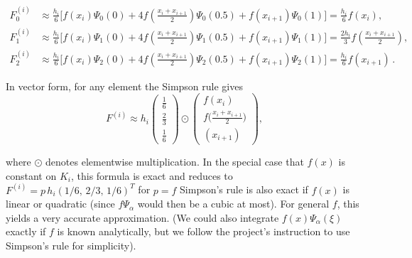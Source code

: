 \begin{align*}
	F^{(i)}_0 & \approx \frac{h_i}{6}\big[f(x_i)\Psi_0(0) + 4f(\tfrac{x_i+x_{i+1}}{2})\Psi_0(0.5)+f(x_{i+1})\Psi_0(1)\big] = \frac{h_i}{6} f(x_i),                                 \\
	F^{(i)}_1 & \approx \frac{h_i}{6}\big[f(x_i)\Psi_1(0) + 4f(\tfrac{x_i+x_{i+1}}{2})\Psi_1(0.5)+f(x_{i+1})\Psi_1(1)\big] = \frac{2h_i}{3} f\!\left(\frac{x_i+x_{i+1}}{2}\right), \\
	F^{(i)}_2 & \approx \frac{h_i}{6}\big[f(x_i)\Psi_2(0) + 4f(\tfrac{x_i+x_{i+1}}{2})\Psi_2(0.5)+f(x_{i+1})\Psi_2(1)\big] = \frac{h_i}{6} f(x_{i+1})\,.
\end{align*}

In vector form, for any element the Simpson rule gives
\[F^{(i)} \approx h_i \begin{pmatrix} 	\frac{1}{6} \\[1ex]\frac{2}{3}\\[1ex] 	\frac{1}{6} \end{pmatrix} \odot \begin{pmatrix} 	f(x_i)                             \\[1ex] 	f\!\big(\frac{x_i+x_{i+1}}{2}\big) \\[1ex] 	(x_{i+1}) \end{pmatrix},\]

where \(\odot\) denotes elementwise multiplication.
In the special case that \(f(x)\) is constant on \(K_i\), this formula is exact and reduces to \(F^{(i)} = p\,h_i(1/6,\,2/3,\,1/6)^T\) for \(p=f\)
Simpson's rule is also exact if \(f(x)\) is linear or quadratic (since \(f\Psi_\alpha\) would then be a cubic at most). For general \(f\), this yields a very accurate approximation. (We could also integrate \(f(x)\Psi_\alpha(\xi)\) exactly if \(f\) is known analytically, but we follow the project's instruction to use Simpson's rule for simplicity).

